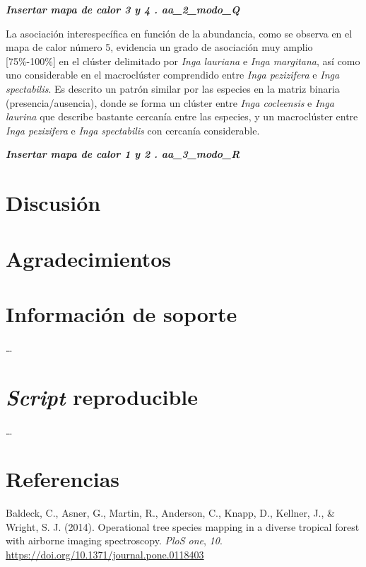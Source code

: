 \documentclass[11pt,]{article}
\begin{document}
\textbf{\emph{Insertar mapa de calor 3 y 4 . aa\_2\_modo\_Q}}

La asociación interespecífica en función de la abundancia, como se
observa en el mapa de calor número 5, evidencia un grado de asociación
muy amplio {[}75\%-100\%{]} en el clúster delimitado por \emph{Inga
lauriana} e \emph{Inga margitana}, así como uno considerable en el
macroclúster comprendido entre \emph{Inga pezizifera} e \emph{Inga
spectabilis}. Es descrito un patrón similar por las especies en la
matriz binaria (presencia/ausencia), donde se forma un clúster entre
\emph{Inga cocleensis} e \emph{Inga laurina} que describe bastante
cercanía entre las especies, y un macroclúster entre \emph{Inga
pezizifera} e \emph{Inga spectabilis} con cercanía considerable.

\textbf{\emph{Insertar mapa de calor 1 y 2 . aa\_3\_modo\_R}}

\section{Discusión}\label{discusiuxf3n}

\section{Agradecimientos}\label{agradecimientos}

\section{Información de soporte}\label{informaciuxf3n-de-soporte}

\ldots

\section{\texorpdfstring{\emph{Script}
reproducible}{Script reproducible}}\label{script-reproducible}

\ldots

\section*{Referencias}\label{referencias}

\hypertarget{refs}{}
\hypertarget{ref-inproceedings}{}
Baldeck, C., Asner, G., Martin, R., Anderson, C., Knapp, D., Kellner,
J., \& Wright, S. J. (2014). Operational tree species mapping in a
diverse tropical forest with airborne imaging spectroscopy. \emph{PloS
one}, \emph{10}. \url{https://doi.org/10.1371/journal.pone.0118403}
\end{document}
